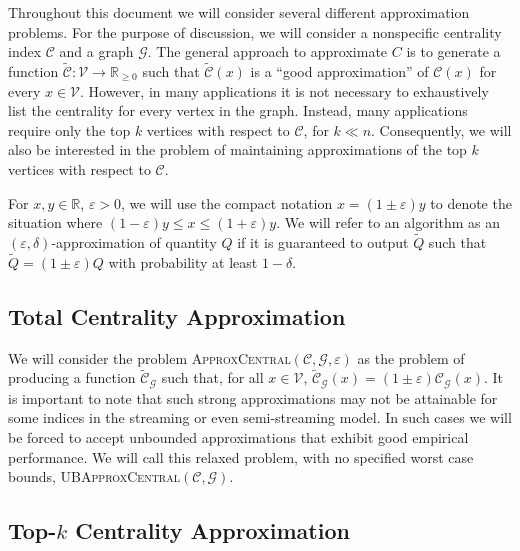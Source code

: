 \documentclass{report}
\newcommand{\algoname}[1]{\textnormal{\textsc{#1}}}
\begin{document}
Throughout this document we will consider several different approximation problems. 
For the purpose of discussion, we will consider a nonspecific centrality index $\mathcal{C}$ and a graph $\mathcal{G}$.
The general approach to approximate $C$ is to generate a function $\widetilde{\mathcal{C}}: \mathcal{V} \rightarrow \mathbb{R}_{\geq 0}$ such that $\widetilde{\mathcal{C}}(x)$ is a ``good approximation'' of $\mathcal{C}(x)$ for every $x \in \mathcal{V}$. 
However, in many applications it is not necessary to exhaustively list the centrality for every vertex in the graph. 
Instead, many applications require only the top $k$ vertices with respect to $\mathcal{C}$, for $k \ll n$. 
Consequently, we will also be interested in the problem of maintaining approximations of the top $k$ vertices with respect to $\mathcal{C}$. 

For $x,y \in \mathbb{R}$, $\varepsilon > 0$, we will use the compact notation $x = (1 \pm \varepsilon)y$ to denote the situation where $(1-\varepsilon)y \leq x \leq (1+\varepsilon)y$. 
We will refer to an algorithm as an $(\varepsilon, \delta)$-approximation of quantity $Q$ if it is guaranteed to output $\widetilde{Q}$ such that $\widetilde{Q} = (1\pm \varepsilon)Q$ with probability at least $1-\delta$. 


\subsection{Total Centrality Approximation} \label{sec:approx:all}

We will consider the problem \algoname{ApproxCentral}$(\mathcal{C}, \mathcal{G}, \varepsilon)$ as the problem of producing a function $\widetilde{\mathcal{C}}_\mathcal{G}$ such that, for all $x \in \mathcal{V}$, $\widetilde{\mathcal{C}}_\mathcal{G}(x) = (1 \pm \varepsilon)\mathcal{C}_\mathcal{G}(x)$. 
It is important to note that such strong approximations may not be attainable for some indices in the streaming or even semi-streaming model. 
In such cases we will be forced to accept unbounded approximations that exhibit good empirical performance. 
We will call this relaxed problem, with no specified worst case bounds, \algoname{UBApproxCentral}$(\mathcal{C}, \mathcal{G})$. 


\subsection{Top-$k$ Centrality Approximation} \label{sec:approx:topk}
\end{document}
